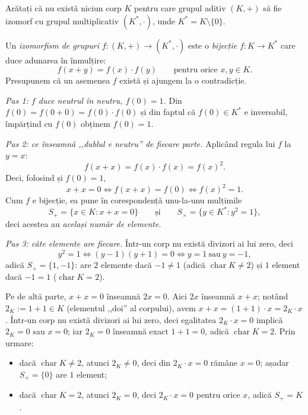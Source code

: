 \begin{problema}[Clasică]
Arătați că nu există niciun corp $K$ pentru care grupul
aditiv $(K,+)$ să fie izomorf cu grupul multiplicativ
$(K^{*},\cdot)$, unde $K^{*}=K\setminus\{0\}$.
\end{problema}

\begin{solutie}
Un \emph{izomorfism de grupuri} $f:(K,+)\to(K^{*},\cdot)$ este o
\emph{bijecție} $f:K\to K^{*}$ care duce adunarea în înmulțire:
\[
  f(x+y)=f(x)\cdot f(y)\qquad\text{pentru orice }x,y\in K.
\]
Presupunem că un asemenea $f$ există și ajungem la o
contradicție.

\smallskip
\textit{Pas 1: $f$ duce neutrul în neutru, $f(0)=1$.} Din
$f(0)=f(0+0)=f(0)\cdot f(0)$ și din faptul că $f(0)\in K^{*}$ e
inversabil, împărțind cu $f(0)$ obținem $f(0)=1$.

\smallskip
\textit{Pas 2: ce înseamnă ,,dublul e neutru'' de fiecare parte.}
Aplicând regula lui $f$ la $y=x$:
\[
  f(x+x)=f(x)\cdot f(x)=f(x)^{2}.
\]
Deci, folosind și $f(0)=1$,
\[
  x+x=0\iff f(x+x)=f(0)\iff f(x)^{2}=1 .
\]
Cum $f$ e bijecție, ea pune în corespondență unu-la-unu
mulțimile
\[
  S_{+}=\{x\in K : x+x=0\}\qquad\text{și}\qquad
  S_{\times}=\{y\in K^{*} : y^{2}=1\},
\]
deci acestea au \emph{același număr de elemente}.

\smallskip
\textit{Pas 3: câte elemente are fiecare.} Într-un corp nu există
divizori ai lui zero, deci
\[
  y^{2}=1\iff(y-1)(y+1)=0\iff y=1\ \text{sau}\ y=-1 ,
\]
adică $S_{\times}=\{1,-1\}$: are $2$ elemente dacă $-1\neq 1$
(adică $\operatorname{char}K\neq 2$) și $1$ element dacă $-1=1$
($\operatorname{char}K=2$).

Pe de altă parte, $x+x=0$ înseamnă $2x=0$. Aici $2x$ înseamnă
$x+x$; notând $2_{K}:=1+1\in K$ (elementul ,,doi'' al corpului), avem
$x+x=(1+1)\cdot x=2_{K}\cdot x$. Într-un corp nu există divizori ai lui
zero, deci egalitatea $2_{K}\cdot x=0$ implică $2_{K}=0$ sau $x=0$; iar
$2_{K}=0$ înseamnă exact $1+1=0$, adică $\operatorname{char}K=2$.
Prin urmare:
\begin{itemize}[nosep,leftmargin=1.4em]
  \item dacă $\operatorname{char}K\neq 2$, atunci $2_{K}\neq 0$, deci din
        $2_{K}\cdot x=0$ rămâne $x=0$; așadar $S_{+}=\{0\}$ are
        $1$ element;
  \item dacă $\operatorname{char}K=2$, atunci $2_{K}=0$, deci
        $2_{K}\cdot x=0$ pentru orice $x$, adică $S_{+}=K$.
\end{itemize}


\end{solutie}
